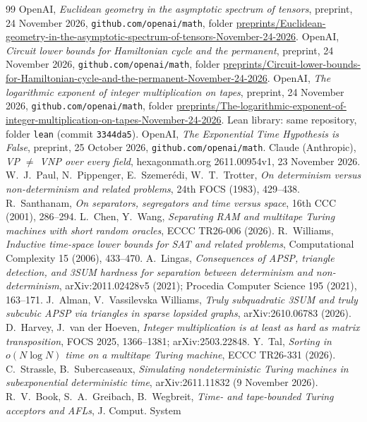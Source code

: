\documentclass[11pt]{article}
\theoremstyle{definition}
\theoremstyle{remark}
\begin{document}
\begin{thebibliography}{99}
 OpenAI, \emph{Euclidean geometry in the asymptotic spectrum of tensors}, preprint, 24 November 2026,
  \texttt{github.com/openai/math}, folder \url{preprints/Euclidean-geometry-in-the-asymptotic-spectrum-of-tensors-November-24-2026}.
 OpenAI, \emph{Circuit lower bounds for Hamiltonian cycle and the permanent}, preprint, 24 November 2026,
  \texttt{github.com/openai/math}, folder \url{preprints/Circuit-lower-bounds-for-Hamiltonian-cycle-and-the-permanent-November-24-2026}.
 OpenAI, \emph{The logarithmic exponent of integer multiplication on tapes}, preprint, 24 November 2026,
  \texttt{github.com/openai/math}, folder
  \url{preprints/The-logarithmic-exponent-of-integer-multiplication-on-tapes-November-24-2026}. Lean library: same repository,
  folder \texttt{lean} (commit \texttt{3344da5}).
 OpenAI, \emph{The Exponential Time Hypothesis is False}, preprint, 25 October 2026, \texttt{github.com/openai/math}.
 Claude (Anthropic), \emph{VP $\ne$ VNP over every field}, hexagonmath.org 2611.00954v1, 23 November 2026.
 W.~J.~Paul, N.~Pippenger, E.~Szemer\'edi, W.~T.~Trotter, \emph{On determinism versus non-determinism and related
  problems}, 24th FOCS (1983), 429--438.
 R.~Santhanam, \emph{On separators, segregators and time versus space}, 16th CCC (2001), 286--294.
 L.~Chen, Y.~Wang, \emph{Separating RAM and multitape Turing machines with short random oracles}, ECCC TR26-006 (2026).
 R.~Williams, \emph{Inductive time-space lower bounds for SAT and related problems}, Computational Complexity 15 (2006),
  433--470.
 A.~Lingas, \emph{Consequences of APSP, triangle detection, and 3SUM hardness for separation between determinism and
  non-determinism}, arXiv:2011.02428v5 (2021); Procedia Computer Science 195 (2021), 163--171.
 J.~Alman, V.~Vassilevska Williams, \emph{Truly subquadratic 3SUM and truly subcubic APSP via triangles in sparse
  lopsided graphs}, arXiv:2610.06783 (2026).
 D.~Harvey, J.~van der Hoeven, \emph{Integer multiplication is at least as hard as matrix transposition}, FOCS 2025,
  1366--1381; arXiv:2503.22848.
 Y.~Tal, \emph{Sorting in $o(N\log N)$ time on a multitape Turing machine}, ECCC TR26-331 (2026).
 C.~Strassle, B.~Subercaseaux, \emph{Simulating nondeterministic Turing machines in subexponential deterministic time},
arXiv:2611.11832 (9 November 2026).
 R.~V.~Book, S.~A.~Greibach, B.~Wegbreit, \emph{Time- and tape-bounded Turing acceptors and AFLs}, J. Comput. System

\end{thebibliography}
\end{document}
